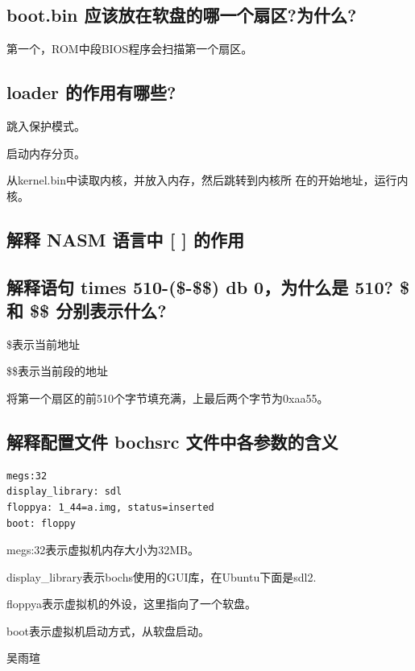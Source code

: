 \documentclass{article}
\begin{document}
\subsection{boot.bin 应该放在软盘的哪一个扇区?为什么?}
第一个，ROM中段BIOS程序会扫描第一个扇区。
\subsection{loader 的作用有哪些?}
跳入保护模式。

启动内存分页。

从kernel.bin中读取内核，并放入内存，然后跳转到内核所 在的开始地址，运行内核。
\subsection{解释 NASM 语言中 [ ] 的作用}


\subsection{解释语句 times 510-(\$-\$\$) db 0，为什么是 510? \$ 和 \$\$ 分别表示什么?}
\$表示当前地址

\$\$表示当前段的地址

将第一个扇区的前510个字节填充满，上最后两个字节为0xaa55。
\subsection{解释配置文件 bochsrc 文件中各参数的含义}
\begin{lstlisting}
megs:32
display_library: sdl
floppya: 1_44=a.img, status=inserted 
boot: floppy
\end{lstlisting}
megs:32表示虚拟机内存大小为32MB。

display\_library表示bochs使用的GUI库，在Ubuntu下面是sdl2.

floppya表示虚拟机的外设，这里指向了一个软盘。

boot表示虚拟机启动方式，从软盘启动。

吴雨瑄
\end{document}
